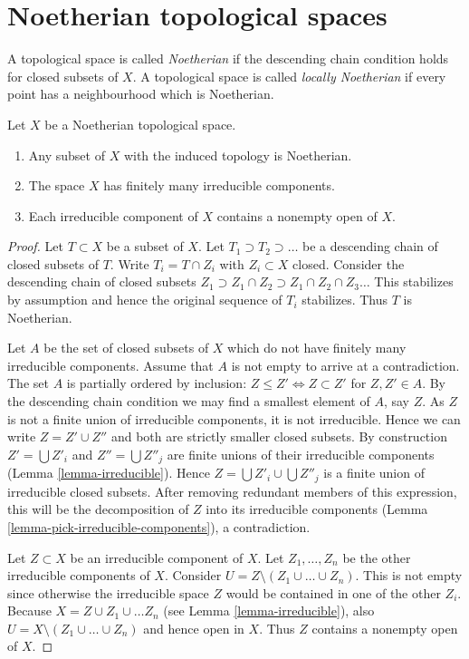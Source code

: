 \section{Noetherian topological spaces}
\label{section-noetherian}

\begin{definition}
\label{definition-noetherian}
A topological space is called {\it Noetherian}
if the descending chain condition holds for
closed subsets of $X$. A topological space is called
{\it locally Noetherian} if every point has a neighbourhood
which is Noetherian.
\end{definition}

\begin{lemma}
\label{lemma-Noetherian}
Let $X$ be a Noetherian topological space.
\begin{enumerate}
\item Any subset of $X$ with the induced topology is Noetherian.
\item The space $X$ has finitely many irreducible components.
\item Each irreducible component of $X$ contains a nonempty open of $X$.
\end{enumerate}
\end{lemma}

\begin{proof}
Let $T \subset X$ be a subset of $X$.
Let $T_1 \supset T_2 \supset \ldots$
be a descending chain of closed subsets of $T$.
Write $T_i =  T \cap Z_i$ with $Z_i \subset X$ closed.
Consider the descending chain of closed subsets
$Z_1 \supset Z_1\cap Z_2 \supset Z_1 \cap Z_2 \cap Z_3 \ldots$
This stabilizes by assumption and hence the original sequence
of $T_i$ stabilizes. Thus $T$ is Noetherian.

\medskip\noindent
Let $A$ be the set of closed subsets of $X$ which do not
have finitely many irreducible components. Assume that
$A$ is not empty to arrive at a contradiction.
The set $A$ is partially ordered by inclusion: $Z \leq Z'
\Leftrightarrow Z \subset Z'$ for $Z, Z' \in A$.
By the descending chain condition we may find a
smallest element of $A$, say $Z$. As $Z$ is not a finite
union of irreducible components, it is not irreducible.
Hence we can write $Z = Z' \cup Z''$ and both are strictly smaller
closed subsets. By construction $Z' = \bigcup Z'_i$ and
$Z'' = \bigcup Z''_j$ are finite unions of their irreducible
components (Lemma \ref{lemma-irreducible}).
Hence $Z = \bigcup Z'_i \cup \bigcup Z''_j$ is
a finite union of irreducible closed subsets.
After removing redundant members of this expression,
this will be the decomposition of $Z$ into its irreducible
components (Lemma \ref{lemma-pick-irreducible-components}), a contradiction.

\medskip\noindent
Let $Z \subset X$ be an irreducible component of $X$.
Let $Z_1, \ldots, Z_n$ be the other irreducible components
of $X$. Consider $U = Z \setminus (Z_1\cup\ldots\cup Z_n)$.
This is not empty since otherwise the irreducible space
$Z$ would be contained in one of the other $Z_i$.
Because $X = Z \cup Z_1 \cup \ldots Z_n$ (see Lemma \ref{lemma-irreducible}),
also $U = X \setminus (Z_1\cup\ldots\cup Z_n)$
and hence open in $X$. Thus $Z$ contains a nonempty
open of $X$.
\end{proof}

